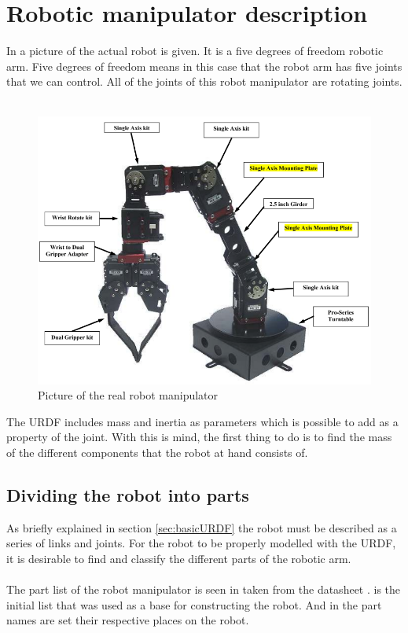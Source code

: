 \section{Robotic manipulator description}
In  a picture of the actual robot is given. It is a five degrees of freedom robotic arm. Five degrees of freedom means in this case that the robot arm has five joints that we can control. All of the joints of this robot manipulator are rotating joints\cite{Crustcrawler}. \\\\
\begin{figure}[htbp]
  \centering
  \includegraphics[width=.7\textwidth]{img/robotAH.png}
  \caption{Picture of the real robot manipulator}
  \label{fig:robotAH}
\end{figure}
The URDF includes mass and inertia as parameters which is possible to add as a property of the joint. With this is mind, the first thing to do is to find the mass of the different components that the robot at hand consists of. 

\subsection{Dividing the robot into parts}
As briefly explained in section \ref{sec:basicURDF} the robot must be described as a series of links and joints. For the robot to be properly modelled with the URDF, it is desirable to find and classify the different parts of the robotic arm.\\\\
The part list of the robot manipulator is seen in  taken from the datasheet \cite{Crustcrawler}.  is the initial list that was used as a base for constructing the robot. And in  the part names are set their respective places on the robot. 

